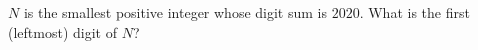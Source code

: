 $N$ is the smallest positive integer whose digit sum is $2020$. What is the first (leftmost) digit of $N$?
